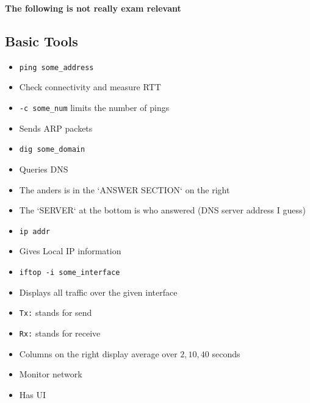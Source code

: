\textbf{The following is not really exam relevant}

\subsection{Basic Tools}
\begin{itemize}
        \begin{itemize}
            \item \verb+ping some_address+
            \item Check connectivity and measure RTT
            \item \verb+-c some_num+ limits the number of pings
            \item Sends ARP packets
        \end{itemize}
        \begin{itemize}
            \item \verb+dig some_domain+
            \item Queries DNS
            \item The anders is in the `ANSWER SECTION` on the right
            \item The `SERVER` at the bottom is who answered (DNS server address I guess)
        \end{itemize}
        \begin{itemize}
            \item \verb+ip addr+
            \item Gives Local IP information
        \end{itemize}
        \begin{itemize}
            \item \verb+iftop -i some_interface+
            \item Displays all traffic over the given interface
            \item \verb+Tx:+ stands for send
            \item \verb+Rx:+ stands for receive
            \item Columns on the right display average over $2, 10, 40$ seconds
        \end{itemize}
        \begin{itemize}
            \item Monitor network
            \item Has UI
        \end{itemize}
        \begin{itemize}

\end{itemize}
\end{itemize}

